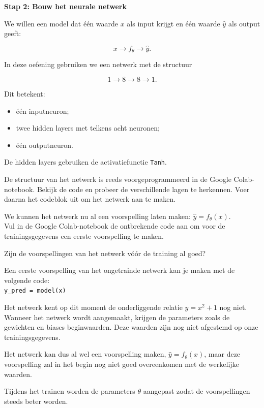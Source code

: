 \documentclass{ximera}
\begin{document}
\begin{question} \textbf{Stap 2: Bouw het neurale netwerk}

We willen een model dat één waarde $x$ als input krijgt en één waarde $\hat y$ als output geeft:

\[
x
\longrightarrow
f_\theta
\longrightarrow
\hat y.
\]

In deze oefening gebruiken we een netwerk met de structuur

\[
\boxed{1\rightarrow8\rightarrow8\rightarrow1}.
\]

Dit betekent:
\begin{itemize}
    \item één inputneuron;
    \item twee hidden layers met telkens acht neuronen;
    \item één outputneuron.
\end{itemize}
De hidden layers gebruiken de activatiefunctie \texttt{Tanh}.

De structuur van het netwerk is reeds voorgeprogrammeerd in de Google Colab-notebook. Bekijk de code en probeer de verschillende lagen te herkennen. Voer daarna het codeblok uit om het netwerk aan te maken.

We kunnen het netwerk nu al een voorspelling laten maken: $\hat y=f_\theta(x).$ \\
Vul in de Google Colab-notebook de ontbrekende code aan om voor de trainingsgegevens een eerste voorspelling te maken.

Zijn de voorspellingen van het netwerk vóór de training al goed?

\begin{multipleChoice}
\end{multipleChoice}

\begin{feedback} \text{ }

Een eerste voorspelling van het ongetrainde netwerk kan je maken met de volgende code: \\
\texttt{y\_pred = model(x)}

Het netwerk kent op dit moment de onderliggende relatie $y=x^2+1$ nog niet. Wanneer het netwerk wordt aangemaakt, krijgen de parameters zoals de gewichten en biases beginwaarden. Deze waarden zijn nog niet afgestemd op onze trainingsgegevens.

Het netwerk kan dus al wel een voorspelling maken, $\hat y= f_\theta(x)$, maar deze voorspelling zal in het begin nog niet goed overeenkomen met de werkelijke waarden.

Tijdens het trainen worden de parameters $\theta$ aangepast zodat de
voorspellingen steeds beter worden.

\end{feedback}

\end{question}
\end{document}
